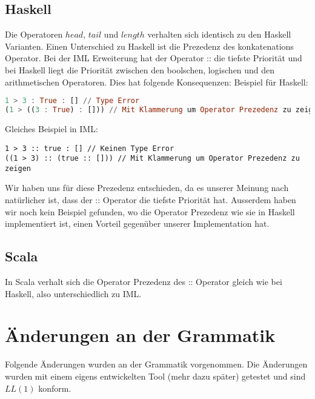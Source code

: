 \documentclass[a4paper,notitlepage,oneside]{scrartcl}
\begin{document}
\subsection{Haskell}
Die Operatoren $head$, $tail$ und $length$ verhalten sich identisch zu den Haskell Varianten. Einen Unterschied zu Haskell ist die Prezedenz des konkatenations Operator. Bei der IML Erweiterung hat der Operator :: die tiefste Priorität und bei Haskell liegt die Priorität zwischen den boolschen, logischen und den arithmetischen Operatoren. Dies hat folgende Konsequenzen:
\newline
\newline
Beispiel für Haskell: 

\begin{lstlisting}[language=haskell, caption=Ungültige Listen Konkatenation in Haskell]
1 > 3 : True : [] // Type Error
(1 > ((3 : True) : [])) // Mit Klammerung um Operator Prezedenz zu zeigen
\end{lstlisting}

\raggedright
Gleiches Beispiel in IML:

\begin{lstlisting}[language=iml, caption=Gültige Listen Konkatenation in IML]
1 > 3 :: true : [] // Keinen Type Error
((1 > 3) :: (true :: [])) // Mit Klammerung um Operator Prezedenz zu zeigen
\end{lstlisting}
Wir haben uns für diese Prezedenz entschieden, da es unserer Meinung nach natürlicher ist, dass der :: Operator die tiefste Priorität hat.
Ausserdem haben wir noch kein Beispiel gefunden, wo die Operator Prezedenz wie sie in Haskell implementiert ist, einen Vorteil gegenüber unserer Implementation hat.

\subsection{Scala}
In Scala verhalt sich die Operator Prezedenz des :: Operator gleich wie bei Haskell, also unterschiedlich zu IML.


\newpage
\section{Änderungen an der Grammatik}
Folgende Änderungen wurden an der Grammatik vorgenommen. Die Änderungen wurden mit einem eigens entwickelten Tool (mehr dazu später) getestet und sind $LL(1)$ konform.
\end{document}
